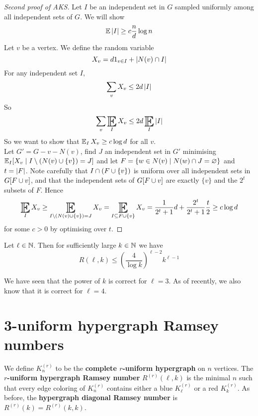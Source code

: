 \documentclass{article}
\begin{document}
\newlec

\begin{proof}[Second proof of AKS]
  Let $I$ be an independent set in $G$ sampled uniformly among all independent sets of $G$. We will show
  $$\mathbb E\left\lvert I\right\rvert \ge c\frac nd\log n$$
  Let $v$ be a vertex. We define the random variable
  $$X_v = d1_{v \in I} + \left\lvert N(v) \cap I\right\rvert$$
  For any independent set $I$,
  $$\sum_v X_v \le 2d\left\lvert I\right\rvert$$
  So
  $$\sum_v \E_I X_v \le 2d \E_I \abs I$$
  So we want to show that $\E_I X_v \ge c \log d$ for all $v$. \\
  Let $G' = G - v - N(v)$, find $J$ an independent set in $G'$ minimising $\E_I[X_v \mid I \setminus (N(v) \union \{v\}) = J]$ and let $F = \{w \in N(v) \mid N(w) \cap J = \varnothing\}$ and $t = \left\lvert F\right\rvert$. Note carefully that $I \cap (F \cup \{v\})$ is uniform over all independent sets in $G[F \cup {v}]$, and that the independent sets of $G[F \cup {v}]$ are exactly $\{v\}$ and the $2^t$ subsets of $F$. Hence
  $$\E_I X_v \ge \E_{I \setminus (N(v) \union \{v\}) = J} X_v = \E_{I \subseteq F \union \{v\}} X_v = \frac 1{2^t + 1}d + \frac{2^t}{2^t + 1}\frac t2 \ge c \log d$$
  for some $c > 0$ by optimising over $t$.
\end{proof}

\begin{thm}
  Let $\ell \in \mathbb N$. Then for sufficiently large $k \in \mathbb N$ we have
  $$R(\ell, k) \le \left(\frac 4{\log k}\right)^{\ell - 2}k^{\ell - 1}$$
\end{thm}

We have seen that the power of $k$ is correct for $\ell = 3$. As of recently, we also know that it is correct for $\ell = 4$.

\clearpage

\section{3-uniform hypergraph Ramsey numbers}

We define $K_n^{(r)}$ to be the {\bf complete $r$-uniform hypergraph} on $n$ vertices. The {\bf $r$-uniform hypergraph Ramsey number} $R^{(r)}(\ell, k)$ is the minimal $n$ such that every edge coloring of $K_n^{(r)}$ contains either a blue $K_\ell^{(r)}$ or a red $K_k^{(r)}$. As before, the {\bf hypergraph diagonal Ramsey number} is $R^{(r)}(k) = R^{(r)}(k, k)$.
\end{document}
